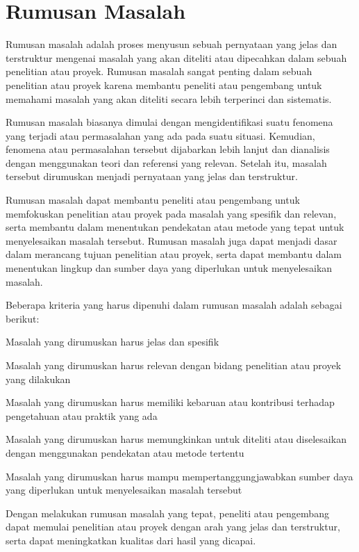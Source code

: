 \section{Rumusan Masalah}
Rumusan masalah adalah proses menyusun sebuah pernyataan yang jelas dan terstruktur mengenai masalah yang akan diteliti atau dipecahkan dalam sebuah penelitian atau proyek. Rumusan masalah sangat penting dalam sebuah penelitian atau proyek karena membantu peneliti atau pengembang untuk memahami masalah yang akan diteliti secara lebih terperinci dan sistematis.

Rumusan masalah biasanya dimulai dengan mengidentifikasi suatu fenomena yang terjadi atau permasalahan yang ada pada suatu situasi. Kemudian, fenomena atau permasalahan tersebut dijabarkan lebih lanjut dan dianalisis dengan menggunakan teori dan referensi yang relevan. Setelah itu, masalah tersebut dirumuskan menjadi pernyataan yang jelas dan terstruktur.

Rumusan masalah dapat membantu peneliti atau pengembang untuk memfokuskan penelitian atau proyek pada masalah yang spesifik dan relevan, serta membantu dalam menentukan pendekatan atau metode yang tepat untuk menyelesaikan masalah tersebut. Rumusan masalah juga dapat menjadi dasar dalam merancang tujuan penelitian atau proyek, serta dapat membantu dalam menentukan lingkup dan sumber daya yang diperlukan untuk menyelesaikan masalah.

Beberapa kriteria yang harus dipenuhi dalam rumusan masalah adalah sebagai berikut:

\begin{packed_item}
    \item Masalah yang dirumuskan harus jelas dan spesifik
    \item Masalah yang dirumuskan harus relevan dengan bidang penelitian atau proyek yang dilakukan
    \item Masalah yang dirumuskan harus memiliki kebaruan atau kontribusi terhadap pengetahuan atau praktik yang ada
    \item Masalah yang dirumuskan harus memungkinkan untuk diteliti atau diselesaikan dengan menggunakan pendekatan atau metode tertentu
    \item Masalah yang dirumuskan harus mampu mempertanggungjawabkan sumber daya yang diperlukan untuk menyelesaikan masalah tersebut
\end{packed_item}

Dengan melakukan rumusan masalah yang tepat, peneliti atau pengembang dapat memulai penelitian atau proyek dengan arah yang jelas dan terstruktur, serta dapat meningkatkan kualitas dari hasil yang dicapai.

